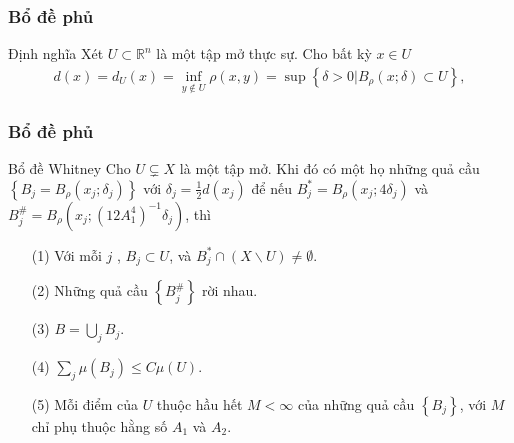 \documentclass[11pt]{beamer}
\numberwithin{equation}{section}
\theoremstyle{plain}
\theoremstyle{definition}
\theoremstyle{remark}
\begin{document}
\begin{frame}\frametitle{Bổ đề phủ}
\begin{block}{Định nghĩa}
Xét $U\subset \mathbb{R}^n$ là một tập mở thực sự. Cho bất kỳ $x\in U$ 
\begin{align*}
d\left( x \right) = {d_U}\left( x \right) = \mathop {\inf }\limits_{y \notin U} \rho \left( {x,y} \right) = \sup \left\{ {\delta  > 0|{B_\rho }\left( {x;\delta } \right) \subset U} \right\},
\end{align*}
\end{block}
\end{frame}
\begin{frame}\frametitle{Bổ đề phủ}
\begin{block}{Bổ đề Whitney}
Cho $U\varsubsetneq X$ là một tập mở. Khi đó có một họ những quả cầu $\left\{B_{j}=B_{\rho}\left(x_{j};\delta_{j}\right)\right\}$ với $\delta_{j}=\frac{1}{2}d\left(x_{j}\right)$ để nếu $B_{j}^{*}=B_{\rho}\left(x_{j};4\delta_{j}\right)$ và $B_{j}^{\#} =B_{\rho}\left(x_{j};\left(12A_{1}^{4}\right)^{-1}\delta_{j}\right)$, thì 
\begin{itemize}
\item[(1)] Với mỗi $j$ , $B_{j}\subset U$, và $B_{j}^{*}\cap\left(X\backslash U\right)\neq \emptyset$.
\item[(2)] Những quả cầu $\left\{B_{j}^{\#}\right\}$ rời nhau.
\item[(3)] $B = \bigcup\limits_j {{B_j}}$.
\item[(4)] $\sum\limits_j {\mu \left( {{B_j}} \right)}  \le C\mu \left( U \right)$.
\item[(5)] Mỗi điểm của $U$ thuộc hầu hết $M<\infty$ của những quả cầu $\left\{B_{j}\right\}$, với $M$ chỉ phụ thuộc hằng số $A_{1}$ và $A_{2}$. 
\end{itemize}
\end{block}
\end{frame}
\end{document}
